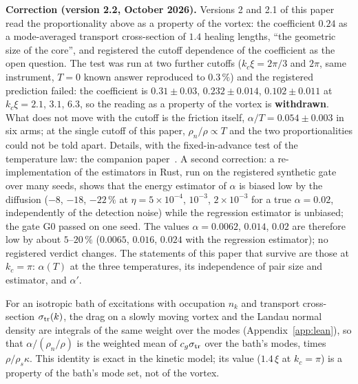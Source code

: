 \documentclass[11pt,a4paper]{article}
\begin{document}
\begin{failbox}
\textbf{Correction (version 2.2, October 2026).} Versions 2 and 2.1 of this paper read the proportionality above as a property of the vortex: the
coefficient $0.24$ as a mode-averaged transport cross-section of $1.4$ healing lengths, ``the geometric size of the core'', and registered the
cutoff dependence of the coefficient as the open question. The test was run at two further cutoffs ($k_c\xi=2\pi/3$ and $2\pi$, same instrument, $T=0$ known answer reproduced to $0.3\,\%$) and the registered
prediction failed: the coefficient is $0.31\pm0.03$, $0.232\pm0.014$, $0.102\pm0.011$ at $k_c\xi=2.1$, $3.1$, $6.3$, so the reading as a property of the vortex is \textbf{withdrawn}.
What does not move with the cutoff is the friction itself, $\alpha/T=0.054\pm0.003$ in six arms; at the single cutoff of this paper, $\rho_n/\rho\propto T$ and the two proportionalities
could not be told apart. Details, with the fixed-in-advance test of the temperature law: the companion paper~\cite{Callens2026b}. A second correction: a re-implementation of the estimators in Rust, run on the registered synthetic gate over many seeds, shows that the energy estimator of $\alpha$ is biased low by the diffusion ($-8$, $-18$, $-22\,\%$ at $\eta=5\times10^{-4}$, $10^{-3}$, $2\times10^{-3}$ for a true $\alpha=0.02$, independently of the detection noise) while the regression estimator is unbiased; the gate G0 passed on one seed. The values $\alpha=0.0062$, $0.014$, $0.02$ are therefore low by about $5$--$20\,\%$ ($0.0065$, $0.016$, $0.024$ with the regression estimator); no registered verdict changes. The statements of this paper that survive are
those at $k_c=\pi$: $\alpha(T)$ at the three temperatures, its independence of pair size and estimator, and $\alpha'$.
\end{failbox}
For an isotropic bath of excitations with occupation $n_k$ and
transport cross-section $\sigma_{\rm tr}(k)$, the drag on a slowly moving vortex and the Landau normal density are integrals of the same weight over the modes (Appendix~\ref{app:lean}),
so that $\alpha/(\rho_n/\rho)$ is the weighted mean of $c_g\sigma_{\rm tr}$ over the bath's modes, times $\rho/\rho_s\kappa$. This identity is exact in the kinetic model; its value
($1.4\,\xi$ at $k_c=\pi$) is a property of the bath's mode set, not of the vortex.
\end{document}
